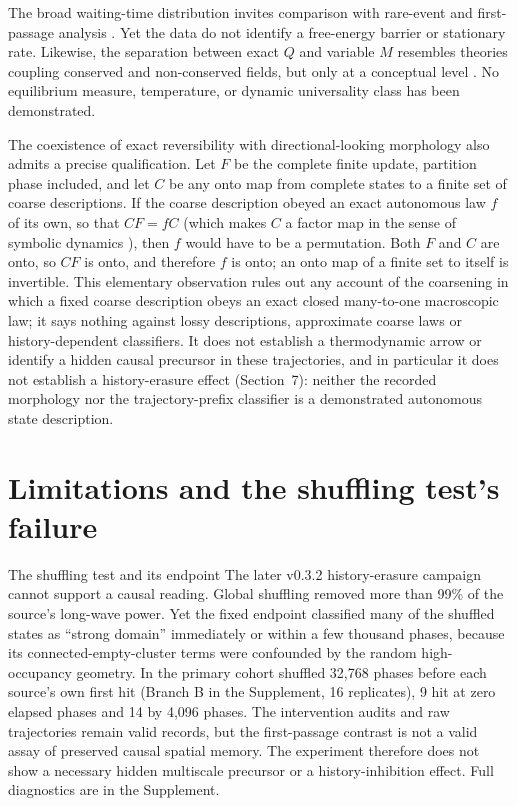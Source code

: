 \documentclass[11pt,a4paper]{article}
\begin{document}
The broad waiting-time distribution invites comparison with rare-event and first-passage analysis \citep{BolhuisDellagoChandler1998,KaplanMeier1958}. Yet the data do not identify a free-energy barrier or stationary rate. Likewise, the separation between exact $Q$ and variable $M$ resembles theories coupling conserved and non-conserved fields, but only at a conceptual level \citep{HohenbergHalperin1977,Bray1994}. No equilibrium measure, temperature, or dynamic universality class has been demonstrated.

The coexistence of exact reversibility with directional-looking morphology also admits a precise qualification. Let $F$ be the complete finite update, partition phase included, and let $C$ be any onto map from complete states to a finite set of coarse descriptions. If the coarse description obeyed an exact autonomous law $f$ of its own, so that $CF=fC$ (which makes $C$ a factor map in the sense of symbolic dynamics \citep[Section~1.5]{LindMarcus1995}), then $f$ would have to be a permutation. Both $F$ and $C$ are onto, so $CF$ is onto, and therefore $f$ is onto; an onto map of a finite set to itself is invertible. This elementary observation rules out any account of the coarsening in which a fixed coarse description obeys an exact closed many-to-one macroscopic law; it says nothing against lossy descriptions, approximate coarse laws or history-dependent classifiers. It does not establish a thermodynamic arrow or identify a hidden causal precursor in these trajectories, and in particular it does not establish a history-erasure effect (Section~7): neither the recorded morphology nor the trajectory-prefix classifier is a demonstrated autonomous state description.

\section{Limitations and the shuffling test's failure}
\begin{corrbox}{The shuffling test and its endpoint}
The later v0.3.2 history-erasure campaign cannot support a causal reading. Global shuffling removed more than 99\% of the source's long-wave power. Yet the fixed endpoint classified many of the shuffled states as ``strong domain'' immediately or within a few thousand phases, because its connected-empty-cluster terms were confounded by the random high-occupancy geometry. In the primary cohort shuffled 32,768 phases before each source's own first hit (Branch B in the Supplement, 16 replicates), 9 hit at zero elapsed phases and 14 by 4,096 phases. The intervention audits and raw trajectories remain valid records, but the first-passage contrast is not a valid assay of preserved causal spatial memory. The experiment therefore does not show a necessary hidden multiscale precursor or a history-inhibition effect. Full diagnostics are in the Supplement.
\end{corrbox}
\end{document}
